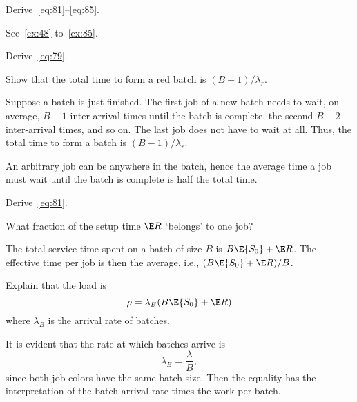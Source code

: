 \begin{exercise}
  Derive~\cref{eq:81}--\cref{eq:85}.
\begin{solution}
    See~\cref{ex:48} to~\cref{ex:85}.
\end{solution}
\end{exercise}

\begin{extra}
  Derive~\cref{eq:79}.
\begin{hint}
 Show that the total time to form a red batch is $(B-1)/\lambda_r$. 
\end{hint}
\begin{solution}
  Suppose a batch is just finished. The first job of a new batch needs to wait, on average, $B-1$  inter-arrival times until the batch is complete, the second $B-2$ inter-arrival times, and so on. The last job does not have to wait at all. Thus, the total time to form a batch is $(B-1)/\lambda_r$. 

An arbitrary job can be anywhere in the batch, hence the average time a job must wait until the batch is complete is half the total time. 
\end{solution}
\end{extra}


\begin{extra}
  Derive~\cref{eq:81}.
\begin{hint}
    What fraction of the setup time $\E R$ `belongs' to one job?
\end{hint}
\begin{solution}
    The total service time spent on a batch of size $B$ is $B \E{S_0} + \E R$. The effective time per job is then the average, i.e.,  $(B \E{S_0}+\E R)/B$. 
\end{solution}
\end{extra}

\begin{extra}
Explain that the load is 
\begin{equation*}
\rho = \lambda_B (B \E{S_0} + \E R)
\end{equation*}
where $\lambda_B$ is the arrival rate of batches. 
\begin{solution}
It is evident that the  rate at which batches arrive is 
\begin{equation*}
  \lambda_B = \frac \lambda B,
\end{equation*}
since both job colors have the same batch size.  
Then  the equality has the interpretation of the batch arrival rate times the work per batch.
\end{solution}
\end{extra}


